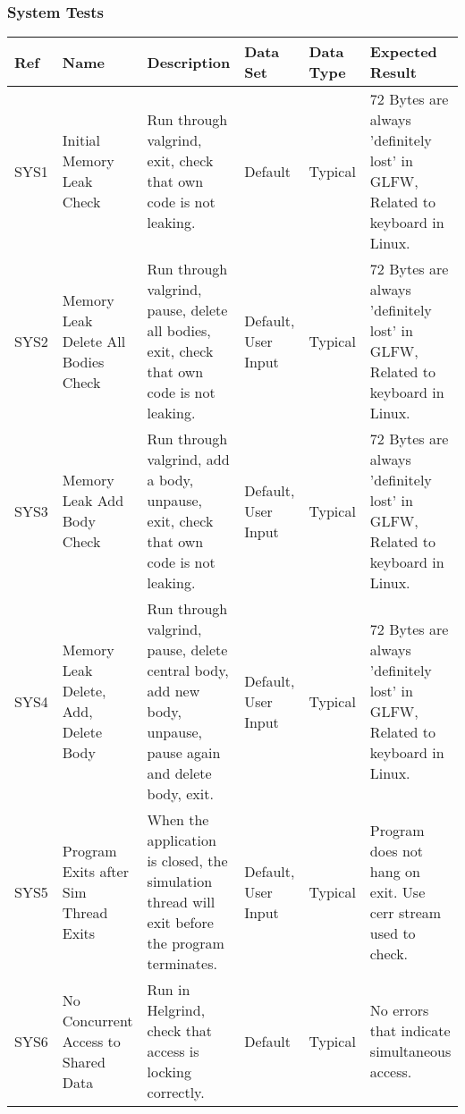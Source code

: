 \vspace{12pt}
\begin{sidewaystable}
\subsubsection{System Tests}
\centering
\def\arraystretch{1.5}
\begin{tabular}{|M{1cm}|P{3cm}|P{5cm}|P{3cm}|P{2cm}|P{4cm}|}
\hline 
\textbf{Ref} & \textbf{Name} & \textbf{Description} & \textbf{Data Set} & \textbf{Data Type} & \textbf{Expected Result} \\ \hline
SYS1 & Initial Memory Leak Check & Run through valgrind, exit, check that own code is not leaking. & Default & Typical & 72 Bytes are always 'definitely lost' in GLFW, Related to keyboard in Linux. \\ \hline
SYS2 & Memory Leak Delete All Bodies Check & Run through valgrind, pause, delete all bodies, exit, check that own code is not leaking. & Default, User Input & Typical & 72 Bytes are always 'definitely lost' in GLFW, Related to keyboard in Linux. \\ \hline
SYS3 & Memory Leak Add Body Check & Run through valgrind, add a body, unpause, exit, check that own code is not leaking. & Default, User Input & Typical & 72 Bytes are always 'definitely lost' in GLFW, Related to keyboard in Linux. \\ \hline
SYS4 & Memory Leak Delete, Add, Delete Body & Run through valgrind, pause, delete central body, add new body, unpause, pause again and delete body, exit. & Default, User Input & Typical & 72 Bytes are always 'definitely lost' in GLFW, Related to keyboard in Linux. \\ \hline
SYS5 & Program Exits after Sim Thread Exits & When the application is closed, the simulation thread will exit before the program terminates. & Default, User Input & Typical & Program does not hang on exit. Use cerr stream used to check. \\ \hline
SYS6 & No Concurrent Access to Shared Data & Run in Helgrind, check that access is locking correctly. & Default & Typical & No errors that indicate simultaneous access. \\
\hline
\end{tabular}
\end{sidewaystable}

